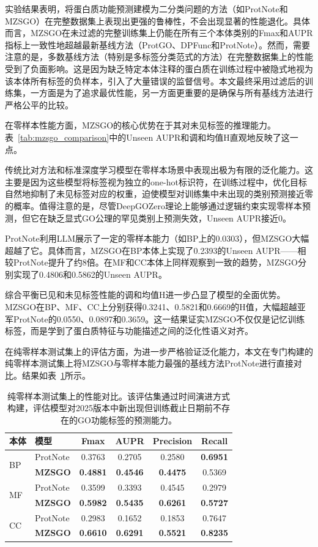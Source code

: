 实验结果表明，将蛋白质功能预测建模为二分类问题的方法（如ProtNote和MZSGO）在完整数据集上表现出更强的鲁棒性，不会出现显著的性能退化。具体而言，MZSGO在未过滤的完整训练集上仍能在所有三个本体类别的Fmax和AUPR指标上一致性地超越最新基线方法（ProtGO、DPFunc和ProtNote）。然而，需要注意的是，多数基线方法（特别是多标签分类范式的方法）在完整数据集上的性能受到了负面影响。这是因为缺乏特定本体注释的蛋白质在训练过程中被隐式地视为该本体所有标签的负样本，引入了大量错误的监督信号。本文最终采用过滤后的训练集，一方面是为了追求最优性能，另一方面更重要的是确保与所有基线方法进行严格公平的比较。

在零样本性能方面，MZSGO的核心优势在于其对未见标签的推理能力。表~\ref{tab:mzsgo_comparison}中的Unseen AUPR和调和均值H直观地反映了这一点。

传统比对方法和标准深度学习模型在零样本场景中表现出极为有限的泛化能力。这主要是因为这些模型将标签视为独立的one-hot标识符，在训练过程中，优化目标自然地抑制了未见标签对应的权重，迫使模型对训练集中未出现的类别预测接近零的概率。值得注意的是，尽管DeepGOZero理论上能够通过逻辑约束实现零样本预测，但它在缺乏显式GO公理的罕见类别上预测失效，Unseen AUPR接近0。

ProtNote利用LLM展示了一定的零样本能力（如BP上的0.0303），但MZSGO大幅超越了它。具体而言，MZSGO在BP本体上实现了0.2393的Unseen AUPR——相较ProtNote提升了约8倍。在MF和CC本体上同样观察到一致的趋势，MZSGO分别实现了0.4806和0.5862的Unseen AUPR。

综合平衡已见和未见标签性能的调和均值H进一步凸显了模型的全面优势。MZSGO在BP、MF、CC上分别获得0.3241、0.5821和0.6669的H值，大幅超越亚军ProtNote的0.0550、0.0897和0.3659。这一结果证实MZSGO不仅仅是记忆训练标签，而是学到了蛋白质特征与功能描述之间的泛化性语义对齐。

在纯零样本测试集上的评估方面，为进一步严格验证泛化能力，本文在专门构建的纯零样本测试集上将MZSGO与零样本能力最强的基线方法ProtNote进行直接对比。结果如表~\ref{tab:mzsgo_zeroshot}所示。

\begin{table}[htbp]
\centering
\caption{纯零样本测试集上的性能对比。该评估集通过时间演进方式构建，评估模型对2025版本中新出现但训练截止日期前不存在的GO功能标签的预测能力。}
\label{tab:mzsgo_zeroshot}
\small
\begin{tabular}{llcccc}
\toprule
\textbf{本体} & \textbf{模型} & \textbf{Fmax} & \textbf{AUPR} & \textbf{Precision} & \textbf{Recall} \\
\midrule
\multirow{2}{*}{BP} 
 & ProtNote & 0.3763 & 0.2705 & 0.2580 & \textbf{0.6951} \\
 & \textbf{MZSGO} & \textbf{0.4881} & \textbf{0.4546} & \textbf{0.4475} & 0.5369 \\
\midrule
\multirow{2}{*}{MF} 
 & ProtNote & 0.3599 & 0.3393 & 0.4545 & 0.2979 \\
 & \textbf{MZSGO} & \textbf{0.5982} & \textbf{0.5435} & \textbf{0.6261} & \textbf{0.5727} \\
\midrule
\multirow{2}{*}{CC} 
 & ProtNote & 0.2983 & 0.1652 & 0.1853 & 0.7647 \\
 & \textbf{MZSGO} & \textbf{0.6610} & \textbf{0.6291} & \textbf{0.5521} & \textbf{0.8235} \\
\bottomrule
\end{tabular}
\end{table}


